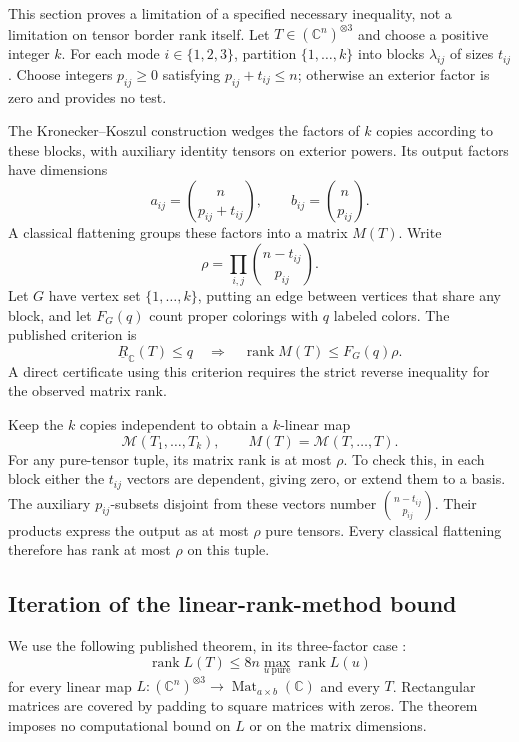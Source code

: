 \documentclass[11pt]{article}
\theoremstyle{definition}
\theoremstyle{remark}
\newcommand{\C}{\mathbb C}
\newcommand{\BR}{\underline R_{\C}}
\newcommand{\rank}{\operatorname{rank}}
\newcommand{\Mat}{\operatorname{Mat}}
\begin{document}
This section proves a limitation of a specified necessary inequality, not a limitation on tensor border rank itself. Let $T\in(\C^n)^{\otimes3}$ and choose a positive integer $k$. For each mode $i\in\{1,2,3\}$, partition $\{1,\ldots,k\}$ into blocks $\lambda_{ij}$ of sizes $t_{ij}$. Choose integers $p_{ij}\ge0$ satisfying $p_{ij}+t_{ij}\le n$; otherwise an exterior factor is zero and provides no test.

The Kronecker--Koszul construction wedges the factors of $k$ copies according to these blocks, with auxiliary identity tensors on exterior powers. Its output factors have dimensions
\begin{equation}\label{eq:factors}
 a_{ij}=\binom n{p_{ij}+t_{ij}},\qquad
 b_{ij}=\binom n{p_{ij}}.
\end{equation}
A classical flattening groups these factors into a matrix $M(T)$. Write
\[
 \rho=\prod_{i,j}\binom{n-t_{ij}}{p_{ij}}.
\]
Let $G$ have vertex set $\{1,\ldots,k\}$, putting an edge between vertices that share any block, and let $F_G(q)$ count proper colorings with $q$ labeled colors. The published criterion is \cite[Corollary 3.5]{dm}
\begin{equation}\label{eq:published}
 \BR(T)\le q\quad\Longrightarrow\quad\rank M(T)\le F_G(q)\rho.
\end{equation}
A direct certificate using this criterion requires the strict reverse inequality for the observed matrix rank.

Keep the $k$ copies independent to obtain a $k$-linear map
\[
 \mathcal M(T_1,\ldots,T_k),\qquad M(T)=\mathcal M(T,\ldots,T).
\]
For any pure-tensor tuple, its matrix rank is at most $\rho$. To check this, in each block either the $t_{ij}$ vectors are dependent, giving zero, or extend them to a basis. The auxiliary $p_{ij}$-subsets disjoint from these vectors number $\binom{n-t_{ij}}{p_{ij}}$. Their products express the output as at most $\rho$ pure tensors. Every classical flattening therefore has rank at most $\rho$ on this tuple.

\subsection{Iteration of the linear-rank-method bound}

We use the following published theorem, in its three-factor case \cite[Theorem 3]{egow}:
\begin{equation}\label{eq:egow}
 \rank L(T)\le 8n\max_{u\ \mathrm{pure}}\rank L(u)
\end{equation}
for every linear map $L:(\C^n)^{\otimes3}\to\Mat_{a\times b}(\C)$ and every $T$. Rectangular matrices are covered by padding to square matrices with zeros. The theorem imposes no computational bound on $L$ or on the matrix dimensions.
\end{document}
